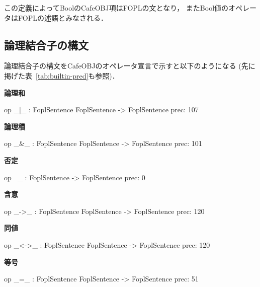 この定義によってBoolのCafeOBJ項はFOPLの文となり，
またBool値のオペレータはFOPLの述語とみなされる．

\subsection{論理結合子の構文}

論理結合子の構文をCafeOBJのオペレータ宣言で示すと以下のようになる
(先に掲げた表~\ref{tab:builtin-pred}も参照)．

\begin{description}
   \item \textbf{論理和}

     \begin{vvtm}
     \begin{simplev}
op _|_ : FoplSentence FoplSentence -> FoplSentence {prec: 107}
     \end{simplev}
   \end{vvtm}

\item \textbf{論理積}
  
   \begin{vvtm}
     \begin{simplev}
op _&_ : FoplSentence FoplSentence -> FoplSentence {prec: 101}
     \end{simplev}
   \end{vvtm}     

\item \textbf{否定}

   \begin{vvtm}
    \begin{simplev}
op ~_ : FoplSentence -> FoplSentence {prec: 0}
     \end{simplev}
   \end{vvtm}

\item \textbf{含意}

   \begin{vvtm}
    \begin{simplev}
op _->_ : FoplSentence FoplSentence -> FoplSentence {prec: 120}
     \end{simplev}
   \end{vvtm}
 
 \item \textbf{同値}

   \begin{vvtm}
    \begin{simplev}
op _<->_ : FoplSentence FoplSentence -> FoplSentence {prec: 120}
     \end{simplev}
   \end{vvtm}
 
 \item \textbf{等号}

   \begin{vvtm}
  \begin{simplev}
op _=_ : FoplSentence FoplSentence -> FoplSentence {prec: 51}
   \end{simplev}
 \end{vvtm}
\end{description}


